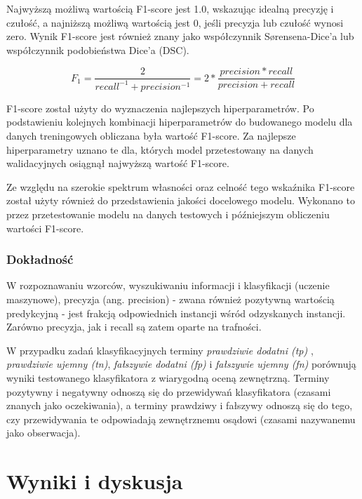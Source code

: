 \documentclass[polish, twoside, 12pt, a4paper]{article}
\theoremstyle{definition}
\theoremstyle{plain}
\theoremstyle{remark}
\begin{document}
Najwyższą możliwą wartością F1-score jest 1.0, wskazując idealną precyzję i czułość, a najniższą możliwą wartością jest 0, jeśli precyzja lub czułość wynosi zero. Wynik F1-score jest również znany jako współczynnik Sørensena-Dice'a lub współczynnik podobieństwa Dice'a (DSC).

\[ F_1 = \frac{2}{recall^{-1} + precision^{-1}} = 2 * \frac{precision * recall}{precision + recall} \]

F1-score został użyty do wyznaczenia najlepszych hiperparametrów. Po podstawieniu kolejnych kombinacji hiperparametrów do budowanego modelu dla danych treningowych obliczana była wartość F1-score. Za najlepsze hiperparametry uznano te dla, których model przetestowany na danych walidacyjnych osiągnął najwyższą wartość F1-score. 

Ze względu na szerokie spektrum własności oraz celność tego wskaźnika F1-score został użyty również do przedstawienia jakości docelowego modelu. Wykonano to przez przetestowanie modelu na danych testowych i późniejszym obliczeniu wartości F1-score.

\subsubsection{Dokładność}

W rozpoznawaniu wzorców, wyszukiwaniu informacji i klasyfikacji (uczenie maszynowe), precyzja (ang. precision)  - zwana również pozytywną wartością predykcyjną - jest frakcją odpowiednich instancji wśród odzyskanych instancji. Zarówno precyzja, jak i recall są zatem oparte na trafności.

W przypadku zadań klasyfikacyjnych terminy \emph{prawdziwie dodatni (tp)} , \emph{prawdziwie ujemny (tn)}, \emph{fałszywie dodatni (fp)} i \emph{fałszywie ujemny (fn)} porównują wyniki testowanego klasyfikatora z wiarygodną oceną zewnętrzną. Terminy pozytywny i negatywny odnoszą się do przewidywań klasyfikatora (czasami znanych jako oczekiwania), a terminy prawdziwy i fałszywy odnoszą się do tego, czy przewidywania te odpowiadają zewnętrznemu osądowi (czasami nazywanemu jako obserwacja).





\clearpage
\section{Wyniki i dyskusja}
\end{document}
